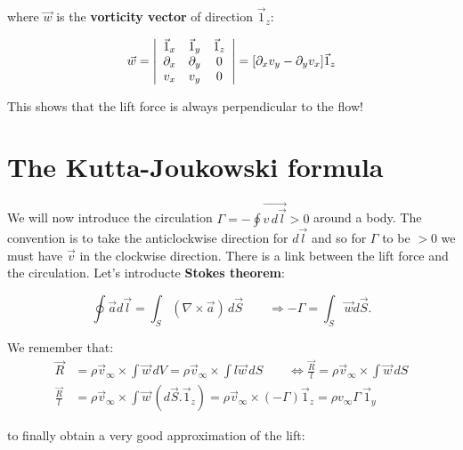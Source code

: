 			where $\vec{w}$ is the \textbf{vorticity vector} of direction $\vec{1}_z$:
			
			\begin{equation}
			\vec{w} = 
			\left| \begin{array}{ccc}
			\vec{1}_x & \vec{1}_y & \vec{1}_z \\ 
			\D _x & \D _y & 0 \\ 
			v_x & v_y & 0
			\end{array} 
			\right| 
			= [\D _x v_y - \D _y v_x] \vec{1}_z
			\end{equation}
			
			This shows that the lift force is always perpendicular to the flow!
		
	\section{The Kutta-Joukowski formula}
		We will now introduce the circulation $\Gamma = - \oint \vec{v \, d\vec{l}} >0$   around a body. The convention is to take the anticlockwise direction for $d\vec{l}$ and so for $\Gamma$ to be $>0$ we must have $\vec{v}$ in the clockwise direction. There is a link between the lift force and the circulation. Let's introducte \textbf{Stokes theorem}:
		
		\begin{equation}
			\oint \vec{a} d\vec{l} = \int _S (\nabla \times \vec{a})\, d\vec{S} \qquad \Rightarrow -\Gamma = \int _S \vec{w} d\vec{S}.
		\end{equation}
		
		We remember that:
		\begin{equation}
		\begin{aligned}
		\vec{R} &= \rho \vec{v}_\infty \times \int  \vec{w}\, dV = \rho \vec{v}_\infty \times \int  l\vec{w}\, dS \qquad \Leftrightarrow \frac{\vec{R}}{l} = \rho \vec{v}_\infty \times \int  \vec{w}\, dS \\
		\frac{\vec{R}}{l}&= \rho \vec{v}_\infty \times \int  \vec{w}\, (d\vec{S}.\vec{1}_z) = \rho \vec{v}_\infty \times (-\Gamma)\vec{1}_z = \rho v_\infty \Gamma \,\vec{1}_y
		\end{aligned}
		\end{equation}
		
		to finally obtain a very good approximation of the lift:
		
		\begin{center}
		\end{center}
		
